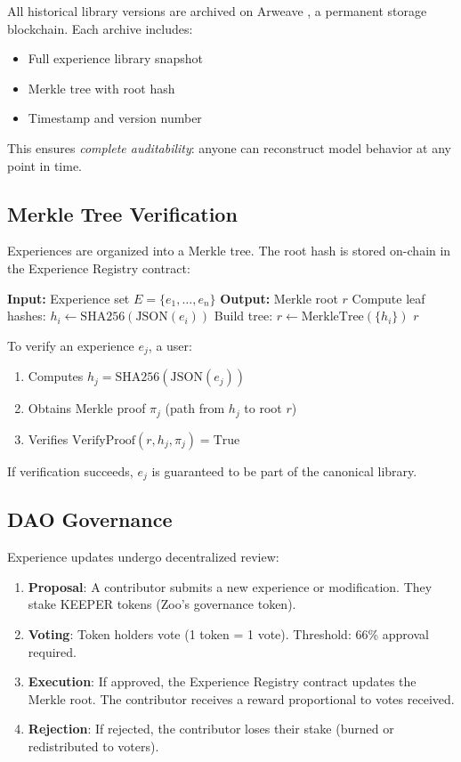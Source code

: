 \documentclass[11pt,a4paper]{article}
\begin{document}
All historical library versions are archived on Arweave \cite{arweave2018whitepaper}, a permanent storage blockchain. Each archive includes:
\begin{itemize}
\item Full experience library snapshot
\item Merkle tree with root hash
\item Timestamp and version number
\end{itemize}

This ensures \textit{complete auditability}: anyone can reconstruct model behavior at any point in time.

\subsection{Merkle Tree Verification}

Experiences are organized into a Merkle tree. The root hash is stored on-chain in the Experience Registry contract:

\begin{algorithm}[H]
\caption{Merkle Tree Construction}
\begin{algorithmic}[1]
\STATE \textbf{Input:} Experience set $E = \{e_1, \ldots, e_n\}$
\STATE \textbf{Output:} Merkle root $r$
\STATE Compute leaf hashes: $h_i \leftarrow \text{SHA256}(\text{JSON}(e_i))$
\STATE Build tree: $r \leftarrow \text{MerkleTree}(\{h_i\})$
\RETURN $r$
\end{algorithmic}
\end{algorithm}

To verify an experience $e_j$, a user:
\begin{enumerate}
\item Computes $h_j = \text{SHA256}(\text{JSON}(e_j))$
\item Obtains Merkle proof $\pi_j$ (path from $h_j$ to root $r$)
\item Verifies $\text{VerifyProof}(r, h_j, \pi_j) = \text{True}$
\end{enumerate}

If verification succeeds, $e_j$ is guaranteed to be part of the canonical library.

\subsection{DAO Governance}

Experience updates undergo decentralized review:

\begin{enumerate}
\item \textbf{Proposal}: A contributor submits a new experience or modification. They stake KEEPER tokens (Zoo's governance token).
\item \textbf{Voting}: Token holders vote (1 token = 1 vote). Threshold: 66\% approval required.
\item \textbf{Execution}: If approved, the Experience Registry contract updates the Merkle root. The contributor receives a reward proportional to votes received.
\item \textbf{Rejection}: If rejected, the contributor loses their stake (burned or redistributed to voters).
\end{enumerate}
\end{document}
